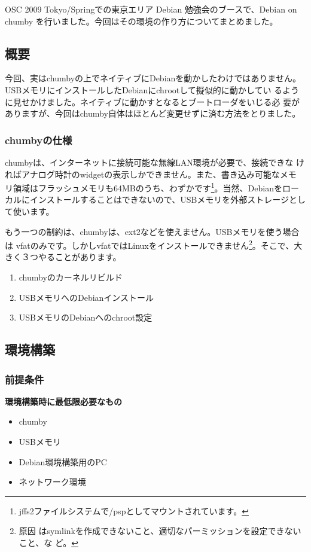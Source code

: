 \documentclass[mingoth,a4paper]{jsarticle}
\begin{document}
OSC 2009 Tokyo/Springでの東京エリア Debian 勉強会のブースで、Debian on
chumby を行いました。今回はその環境の作り方についてまとめました。
\begin{multicols}{2}
\subsection{概要}
今回、実はchumbyの上でネイティブにDebianを動かしたわけではありません。
USBメモリにインストールしたDebianにchrootして擬似的に動かしてい
るように見せかけました。ネイティブに動かすとなるとブートローダをいじる必
要がありますが、今回はchumby自体はほとんど変更せずに済む方法をとりました。

\subsubsection{chumbyの仕様}
chumbyは、インターネットに接続可能な無線LAN環境が必要で、接続できな
ければアナログ時計のwidgetの表示しかできません。また、書き込み可能なメモ
リ領域はフラッシュメモリも64MBのうち、わずかです\footnote{jffs2ファイルシステムで/pspとしてマウントされています。}。当然、Debianをローカルにインストールすることはできないので、USBメモリを外部ストレージとして使います。

もう一つの制約は、chumbyは、ext2などを使えません。USBメモリを使う場合は
vfatのみです。しかしvfatではLinuxをインストールできません\footnote{原因
はsymlinkを作成できないこと、適切なパーミッションを設定できないこと、な
ど。}。そこで、大きく３つやることがあります。
\begin{enumerate}
\item chumbyのカーネルリビルド
\item USBメモリへのDebianインストール
\item USBメモリのDebianへのchroot設定
\end{enumerate}
\subsection{環境構築}
\subsubsection{前提条件}
\textbf{環境構築時に最低限必要なもの}
\begin{itemize}
\item chumby
\item USBメモリ
\item Debian環境構築用のPC
\item ネットワーク環境
\end{itemize}

\end{multicols}
\end{document}
